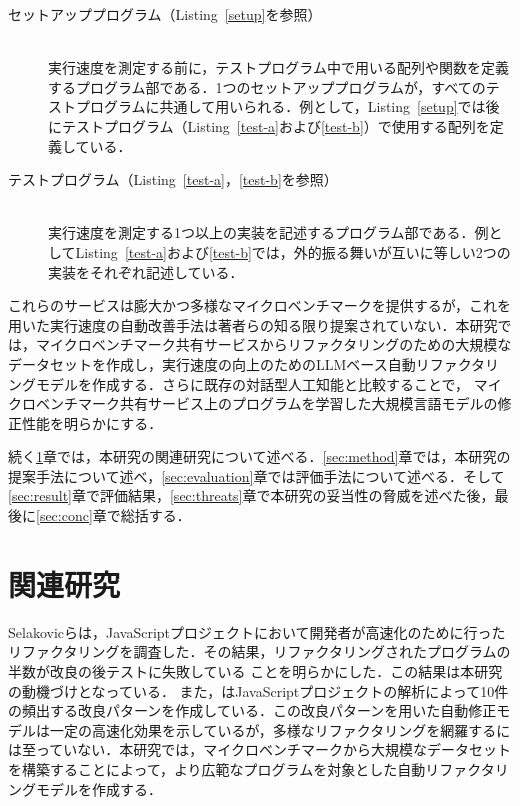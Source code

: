 \documentclass[submit,techrep,noauthor]{ipsj}
\newcommand{\todo}[1]{\colorbox{yellow}{{\bf TODO}:}{\color{red} {\textbf{[#1]}}}}
\begin{document}
\begin{description}

\item[セットアッププログラム（Listing~\ref{setup}を参照）]\mbox{}\\
実行速度を測定する前に，テストプログラム中で用いる配列や関数を定義するプログラム部である．1つのセットアッププログラムが，すべてのテストプログラムに共通して用いられる．例として，Listing~\ref{setup}では後にテストプログラム（Listing~\ref{test-a}および\ref{test-b}）で使用する配列を定義している．

\item[テストプログラム（Listing~\ref{test-a}，\ref{test-b}を参照）]\mbox{}\\
実行速度を測定する1つ以上の実装を記述するプログラム部である．例としてListing~\ref{test-a}および\ref{test-b}では，外的振る舞いが互いに等しい2つの実装をそれぞれ記述している．

\end{description}


これらのサービスは膨大かつ多様なマイクロベンチマークを提供するが，これを用いた実行速度の自動改善手法は著者らの知る限り提案されていない．本研究では，マイクロベンチマーク共有サービスからリファクタリングのための大規模なデータセットを作成し，実行速度の向上のためのLLMベース自動リファクタリングモデルを作成する．さらに既存の対話型人工知能と比較することで，%
マイクロベンチマーク共有サービス上のプログラムを学習した大規模言語モデルの修正性能を明らかにする．

続く\ref{sec:related}章では，本研究の関連研究について述べる．\ref{sec:method}章では，本研究の提案手法について述べ，\ref{sec:evaluation}章では評価手法について述べる．そして\ref{sec:result}章で評価結果，\ref{sec:threats}章で本研究の妥当性の脅威を述べた後，最後に\ref{sec:conc}章で総括する．

\section{関連研究}\label{sec:related}

Selakovicら\cite{Selakovic_2016}は，JavaScriptプロジェクトにおいて開発者が高速化のために行ったリファクタリングを調査した．その結果，リファクタリングされたプログラムの半数が改良の後テストに失敗している%
ことを明らかにした．この結果は本研究の動機づけとなっている．%
また，\cite{Selakovic_2016}はJavaScriptプロジェクトの解析によって10件の頻出する改良パターンを作成している．この改良パターンを用いた自動修正モデルは一定の高速化効果を示しているが，多様なリファクタリングを網羅するには至っていない．本研究では，マイクロベンチマークから大規模なデータセットを構築することによって，より広範なプログラムを対象とした自動リファクタリングモデルを作成する．
\end{document}
